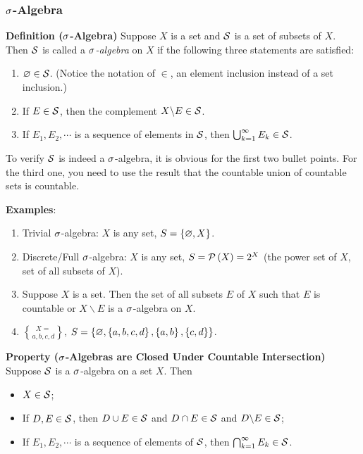 \documentclass[
]{article}
\begin{document}
\hypertarget{ux3c3--algebra}{%
\subsubsection{\texorpdfstring{\(\s\)-Algebra}{\textbackslash s-Algebra}}\label{ux3c3--algebra}}

\textbf{Definition (\(\s\)-Algebra)} Suppose \(X\) is a set and \(\S\)
is a set of subsets of \(X\). Then \(\S\) is called a
\emph{\(\s\)-algebra} on \(X\) if the following three statements are
satisfied:

\begin{enumerate}
\def\labelenumi{\arabic{enumi}.}
\item
  \(\empty\in \S\). (Notice the notation of \(\in\), an element
  inclusion instead of a set inclusion.)
\item
  If \(E\in \S\), then the complement \(X\backslash E\in \S\).
\item
  If \(E_1,E_2,\cdots\) is a sequence of elements in \(\S\), then
  \(\bigcup_{k = 1}^{\infty}E_k\in \S\).
\end{enumerate}

To verify \(\S\) is indeed a \(\s\)-algebra, it is obvious for the first
two bullet points. For the third one, you need to use the result that
the countable union of countable sets is countable.

\textbf{Examples}:

\begin{enumerate}
\def\labelenumi{\arabic{enumi}.}
\item
  Trivial \(\s\)-algebra: \(X\) is any set, \(S = \brace{\empty,X}\).
\item
  Discrete/Full \(\s\)-algebra: \(X\) is any set, \(S = \P\pr{X} = 2^X\)
  (the power set of \(X\), set of all subsets of \(X\)).
\item
  Suppose \(X\) is a set. Then the set of all subsets \(E\) of \(X\)
  such that \(E\) is countable or \(X\backslash E\) is a \(\s\)-algebra
  on \(X\).
\item
  \(X = \brace{a,b,c,d}\),
  \(S = \brace{\empty,\brace{a,b,c,d},\brace{a,b},\brace{c,d}}\).
\end{enumerate}

\textbf{Property (\(\s\)-Algebras are Closed Under Countable
Intersection)} Suppose \(\S\) is a \(\s\)-algebra on a set \(X\). Then

\begin{itemize}
\item
  \(X\in \S\);
\item
  If \(D,E\in \S\), then \(D\cup E\in \S\) and \(D\cap E\in \S\) and
  \(D\backslash E \in \S\);
\item
  If \(E_1,E_2,\cdots\) is a sequence of elements of \(\S\), then
  \(\bigcap_{k = 1}^{\infty}E_k\in \S\).
\end{itemize}
\end{document}

